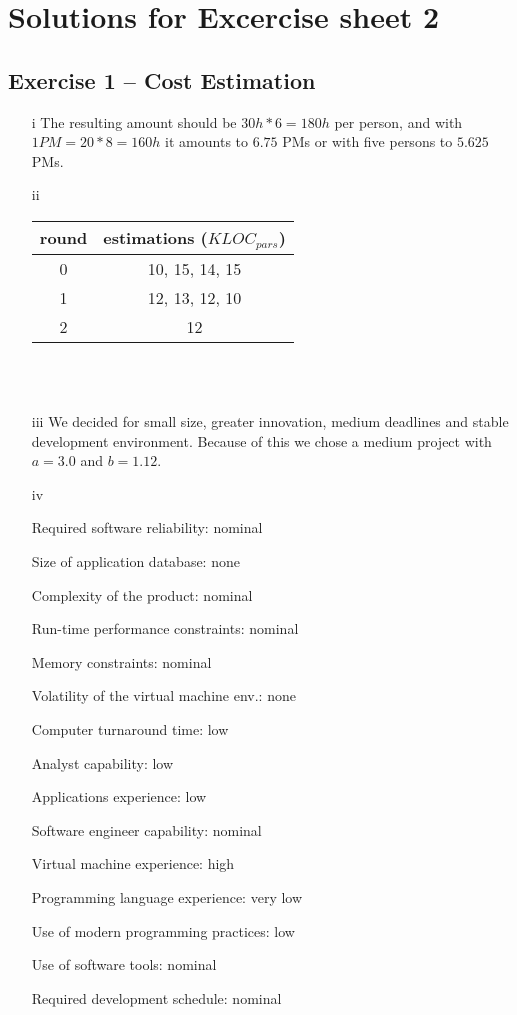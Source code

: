 \documentclass{scrartcl}
\begin{document}
\section*{Solutions for Excercise sheet 2}

\subsection*{Exercise 1 – Cost Estimation}
\begin{itemize}
	\item[i]
	The resulting amount should be $30h*6=180h$ per person, and with $1 PM=20*8=160h$ it amounts to $6.75$ PMs or with five persons to $5.625$ PMs.\\
	\item[ii]
	\begin{tabular} {| c | c |}
		round & estimations ($KLOC_{pars}$)\\
		\hline
		0 & 10, 15, 14, 15 \\
		1 & 12, 13, 12, 10\\
		2 & 12\\
	\end{tabular}\\\\
	\item[iii]
	We decided for small size, greater innovation, medium deadlines and stable development environment. Because of this we chose a medium project with $a=3.0$ and $b=1.12$.\\
	\item[iv]
		\item[]Required software reliability: nominal
		\item[]Size of application database:  none
		\item[]Complexity of the product:  nominal
		\item[]Run-time performance constraints:   nominal
		\item[]Memory constraints:  nominal
		\item[]Volatility of the virtual machine env.:  none
		\item[]Computer turnaround time:  low
		\item[]Analyst capability:  low
		\item[]Applications experience:  low
		\item[]Software engineer capability:  nominal
		\item[]Virtual machine experience:  high
		\item[]Programming language experience:  very low
		\item[]Use of modern programming practices:  low
		\item[]Use of software tools:  nominal
		\item[]Required development schedule:  nominal



\end{itemize}
\end{document}
